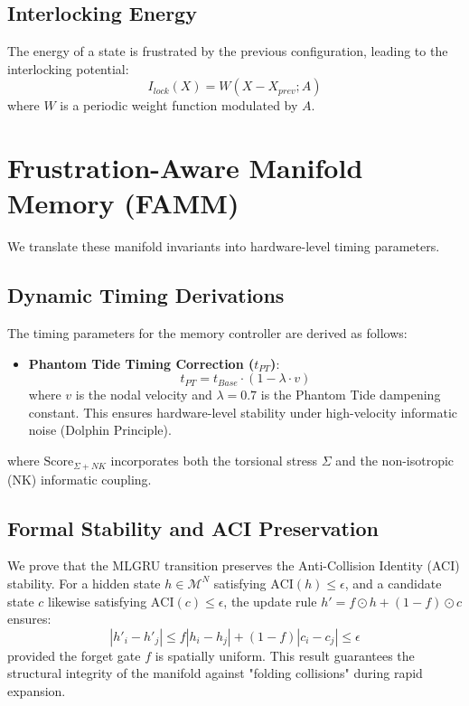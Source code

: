 \documentclass[11pt,a4paper]{article}
\begin{document}
\subsection{Interlocking Energy}
The energy of a state is frustrated by the previous configuration, leading to the interlocking potential:
\begin{equation}
    I_{lock}(X) = W(X - X_{prev}; A)
\end{equation}
where $W$ is a periodic weight function modulated by $A$.

\section{Frustration-Aware Manifold Memory (FAMM)}
We translate these manifold invariants into hardware-level timing parameters.

\subsection{Dynamic Timing Derivations}
The timing parameters for the memory controller are derived as follows:
\begin{itemize}
    \item \textbf{Phantom Tide Timing Correction ($t_{PT}$)}: 
    \begin{equation}
        t_{PT} = t_{Base} \cdot (1 - \lambda \cdot v)
    \end{equation}
    where $v$ is the nodal velocity and $\lambda = 0.7$ is the Phantom Tide dampening constant. This ensures hardware-level stability under high-velocity informatic noise (Dolphin Principle).
\end{itemize}

where $\text{Score}_{\Sigma+NK}$ incorporates both the torsional stress $\Sigma$ and the non-isotropic (NK) informatic coupling.

\subsection{Formal Stability and ACI Preservation}
We prove that the MLGRU transition preserves the Anti-Collision Identity (ACI) stability. For a hidden state $h \in \mathcal{M}^N$ satisfying $\text{ACI}(h) \le \epsilon$, and a candidate state $c$ likewise satisfying $\text{ACI}(c) \le \epsilon$, the update rule $h' = f \odot h + (1-f) \odot c$ ensures:
\begin{equation}
    |h'_i - h'_j| \le f|h_i - h_j| + (1-f)|c_i - c_j| \le \epsilon
\end{equation}
provided the forget gate $f$ is spatially uniform. This result guarantees the structural integrity of the manifold against "folding collisions" during rapid expansion.
\end{document}
